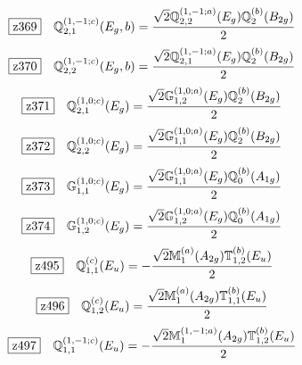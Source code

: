 \documentclass[fleqn,10pt,landscape]{jsarticle}
\begin{document}
\begin{dmath*}
\hspace*{3mm}\fbox{z369}\quad \mathbb{Q}_{2,1}^{(1,-1;c)}(E_{g},b)=\frac{\sqrt{2} \mathbb{Q}_{2,2}^{(1,-1;a)}(E_{g}) \mathbb{Q}_{2}^{(b)}(B_{2g})}{2}
\end{dmath*}
\begin{dmath*}
\hspace*{3mm}\fbox{z370}\quad \mathbb{Q}_{2,2}^{(1,-1;c)}(E_{g},b)=\frac{\sqrt{2} \mathbb{Q}_{2,1}^{(1,-1;a)}(E_{g}) \mathbb{Q}_{2}^{(b)}(B_{2g})}{2}
\end{dmath*}
\begin{dmath*}
\hspace*{3mm}\fbox{z371}\quad \mathbb{Q}_{2,1}^{(1,0;c)}(E_{g})=\frac{\sqrt{2} \mathbb{G}_{1,2}^{(1,0;a)}(E_{g}) \mathbb{Q}_{2}^{(b)}(B_{2g})}{2}
\end{dmath*}
\begin{dmath*}
\hspace*{3mm}\fbox{z372}\quad \mathbb{Q}_{2,2}^{(1,0;c)}(E_{g})=\frac{\sqrt{2} \mathbb{G}_{1,1}^{(1,0;a)}(E_{g}) \mathbb{Q}_{2}^{(b)}(B_{2g})}{2}
\end{dmath*}
\begin{dmath*}
\hspace*{3mm}\fbox{z373}\quad \mathbb{G}_{1,1}^{(1,0;c)}(E_{g})=\frac{\sqrt{2} \mathbb{G}_{1,1}^{(1,0;a)}(E_{g}) \mathbb{Q}_{0}^{(b)}(A_{1g})}{2}
\end{dmath*}
\begin{dmath*}
\hspace*{3mm}\fbox{z374}\quad \mathbb{G}_{1,2}^{(1,0;c)}(E_{g})=\frac{\sqrt{2} \mathbb{G}_{1,2}^{(1,0;a)}(E_{g}) \mathbb{Q}_{0}^{(b)}(A_{1g})}{2}
\end{dmath*}
\begin{dmath*}
\hspace*{3mm}\fbox{z495}\quad \mathbb{Q}_{1,1}^{(c)}(E_{u})=- \frac{\sqrt{2} \mathbb{M}_{1}^{(a)}(A_{2g}) \mathbb{T}_{1,2}^{(b)}(E_{u})}{2}
\end{dmath*}
\begin{dmath*}
\hspace*{3mm}\fbox{z496}\quad \mathbb{Q}_{1,2}^{(c)}(E_{u})=\frac{\sqrt{2} \mathbb{M}_{1}^{(a)}(A_{2g}) \mathbb{T}_{1,1}^{(b)}(E_{u})}{2}
\end{dmath*}
\begin{dmath*}
\hspace*{3mm}\fbox{z497}\quad \mathbb{Q}_{1,1}^{(1,-1;c)}(E_{u})=- \frac{\sqrt{2} \mathbb{M}_{1}^{(1,-1;a)}(A_{2g}) \mathbb{T}_{1,2}^{(b)}(E_{u})}{2}
\end{dmath*}
\end{document}
